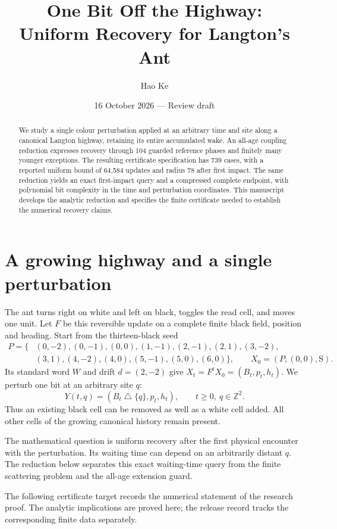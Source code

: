 \documentclass[11pt]{article}
\title{One Bit Off the Highway:\\Uniform Recovery for Langton's Ant}
\author{Hao Ke}
\date{16 October 2026 --- Review draft}
\newcommand{\Z}{\mathbb Z}\newcommand{\N}{\mathbb N}
\newcommand{\xor}{\mathbin{\triangle}}
\begin{document}
\maketitle
\begin{abstract}
We study a single colour perturbation applied at an arbitrary time and site
along a canonical Langton highway, retaining its entire accumulated wake.
An all-age coupling reduction expresses recovery through 104 guarded
reference phases and finitely many younger exceptions. The resulting
certificate specification has 739 cases, with a reported uniform bound of
64,584 updates and radius 78 after first impact. The same reduction yields
an exact first-impact query and a compressed complete endpoint, with
polynomial bit complexity in the time and perturbation coordinates.
This manuscript develops the analytic reduction and specifies the finite
certificate needed to establish the numerical recovery claims.
\end{abstract}

\section{A growing highway and a single perturbation}
The ant turns right on white and left on black, toggles the read cell, and
moves one unit. Let $F$ be this reversible update on a complete finite black
field, position and heading. Start from the thirteen-black seed
\[
\begin{split}
 P=\{&(0,-2),(0,-1),(0,0),(1,-1),(2,-1),(2,1),(3,-2),\\
     &(3,1),(4,-2),(4,0),(5,-1),(5,0),(6,0)\},
 \qquad X_0=(P,(0,0),\mathrm S).
\end{split}
\]
Its standard word $W$ and drift $d=(2,-2)$ give $X_t=F^tX_0=(B_t,p_t,h_t)$.
We perturb one bit at an arbitrary site $q$:
\[
 Y(t,q)=(B_t\xor\{q\},p_t,h_t),\qquad t\ge0,\ q\in\Z^2.
\]
Thus an existing black cell can be removed as well as a white cell added.
All other cells of the growing canonical history remain present.

The mathematical question is uniform recovery after the first physical
encounter with the perturbation. Its waiting time can depend on an arbitrarily
distant $q$. The reduction below separates this exact waiting-time query from
the finite scattering problem and the all-age extension guard.

The following certificate target records the numerical statement of the
research proof. The analytic implications are proved here; the release
record tracks the corresponding finite data separately.
\end{document}
